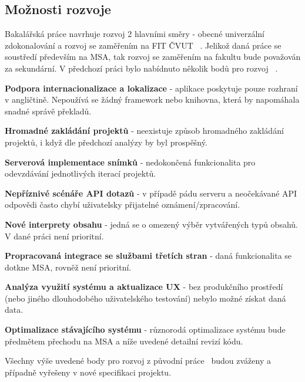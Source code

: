 \subsection{Možnosti rozvoje}

Bakalářská práce navrhuje rozvoj 2 hlavními směry - obecné univerzální zdokonalování a rozvoj se zaměřením na \gls{FIT} \gls{ČVUT}~\cite{bachelorthesis} .
Jelikož daná práce se soustředí především na \gls{MSA}, tak rozvoj se zaměřením na fakultu bude považován za sekundární.
V předchozí práci bylo nabídnuto několik bodů pro rozvoj~\cite{bachelorthesis} .


\begin{ul}
   \item
   \textbf{Podpora internacionalizace a lokalizace} - aplikace poskytuje pouze rozhraní v angličtině.
   Nepoužívá se žádný framework nebo knihovna, která by napomáhala snadné správě překladů.
   \item
   \textbf{Hromadné zakládání projektů} - neexistuje způsob hromadného zakládání projektů, i když dle předchozí analýzy by byl prospěšný.
   \item
   \textbf{Serverová implementace snímků} - nedokončená funkcionalita pro odevzdávání jednotlivých iterací projektů.
   \item
   \textbf{Nepříznivé scénáře \gls{API} dotazů} - v případě pádu serveru a neočekávané \gls{API} odpovědi často chybí uživatelsky přijatelné oznámení/zpracování.
   \item
   \textbf{Nové interprety obsahu} - jedná se o omezený výběr vytvářených typů obsahů.
   V dané práci není prioritní.
   \item
   \textbf{Propracovaná integrace se službami třetích stran} - daná funkcionalita se dotkne \gls{MSA}, rovněž není prioritní.
   \item
   \textbf{Analýza využití systému a aktualizace \gls{UX}} - bez produkčního prostředí (nebo jiného dlouhodobého uživatelského testování) nebylo možné získat daná data.
   \item
   \textbf{Optimalizace stávajícího systému} - různorodá optimalizace systému bude předmětem přechodu na \gls{MSA} a níže uvedené detailní revizí kódu.
\end{ul}

Všechny výše uvedené body pro rozvoj z původní práce~\cite{bachelorthesis} budou zváženy a případně vyřešeny v nové specifikaci projektu.



